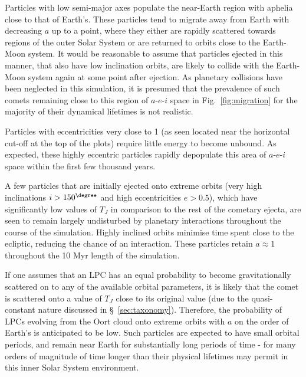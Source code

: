 Particles with low semi-major axes populate the near-Earth region with aphelia close to that of Earth's. These particles tend to migrate away from Earth with decreasing $a$ up to a point, where they either are rapidly scattered towards regions of the outer Solar System or are returned to orbits close to the Earth-Moon system. It would be reasonable to assume that particles ejected in this manner, that also have low inclination orbits, are likely to collide with the Earth-Moon system again at some point after ejection. As planetary collisions have been neglected in this simulation, it is presumed that the prevalence of such comets remaining close to this region of $a$-$e$-$i$ space in Fig.~\ref{fig:migration} for the majority of their dynamical lifetimes is not realistic.

Particles with eccentricities very close to 1 (as seen located near the horizontal cut-off at the top of the plots) require little energy to become unbound. As expected, these highly eccentric particles rapidly depopulate this area of $a$-$e$-$i$ space within the first few thousand years.

A few particles that are initially ejected onto extreme orbits (very high inclinations $i > 150^\degree$ and high eccentricities $e>0.5$), which have significantly low values of $T_J$ in comparison to the rest of the cometary ejecta, are seen to remain largely undisturbed by planetary interactions throughout the course of the simulation.  Highly inclined orbits minimise time spent close to the ecliptic, reducing the chance of an interaction. These particles retain $a \approx 1$ throughout the 10 Myr length of the simulation.

If one assumes that an LPC has an equal probability to become gravitationally scattered on to any of the available orbital parameters, it is likely that the comet is scattered onto a value of $T_J$ close to its original value (due to the quasi-constant nature discussed in \S~\ref{sec:taxonomy}). Therefore, the probability of LPCs evolving from the Oort cloud onto extreme orbits with $a$ on the order of Earth's is anticipated to be low. Such particles are expected to have small orbital periods, and remain near Earth for substantially long periods of time - for many orders of magnitude of time longer than their physical lifetimes may permit in this inner Solar System environment.



